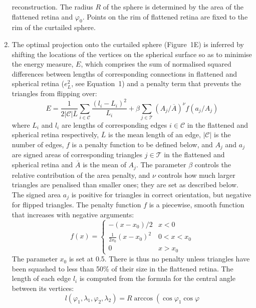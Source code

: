 \documentclass[10pt]{article}
\newcounter{Figure}
\begin{document}
\begin{enumerate}
reconstruction. The radius  $R$ of the sphere is determined by the
area of the flattened retina and  $\varphi _0$. Points on the rim of
flattened retina are fixed to the rim of the curtailed sphere. 
\item The optimal projection onto the curtailed sphere (Figure~1E) is
inferred by shifting the locations of the vertices on the spherical
surface so as to minimise the energy measure,  $E$, which comprises
the sum of normalised squared differences between lengths of
corresponding connections in flattened and spherical retina ($e_L^2$, see Equation~1) and a penalty term that prevents the
triangles from flipping over:
\begin{equation}
E=\frac 1{2|\mathcal{C}|\overline L}\underset{i\in\mathcal{C}}{\sum
}\frac{\left(l_i-L_i\right)^2}{L_i}+\beta \underset{j\in\mathcal{T}}{\sum
}\left(A_j/\overline A\right)^{\nu }f\left(a_j/A_j\right)
\end{equation}
 where  $L_i$ and  $l_i$ are lengths of corresponding edges 
$i\in\mathcal{C}$ in the flattened and spherical retina respectively, 
$\overline L$ is the mean length of an edge,  $|\mathcal{C}|$ is the number of
edges,  $f$ is a penalty function to be defined below, and  $A_j$ and
 $a_j$ are signed areas of corresponding triangles  $j\in\mathcal{T}$ in the
flattened and spherical retina and  $\overline A$ is the mean of 
$A_j$. The parameter  $\beta $ controls the relative contribution of
the area penalty, and  $\nu $ controls how much larger triangles are
penalised than smaller ones; they are set as described below. The
signed area  $a_j$ is positive for triangles in correct orientation,
but negative for flipped triangles. The penalty function  $f$ is a
piecewise, smooth function that increases with negative arguments:
\begin{equation}
f\left(x\right)=\left\{\begin{matrix}-\left(x-x_0\right)/2&x<0\\\frac
1{2x_0}\left(x-x_0\right)^2&0<x<x_0\\0&x>x_0\end{matrix}\right.
\end{equation}
 The parameter  $x_0$ is set at 0.5. There is thus no penalty
unless triangles have been squashed to less than 50\% of their size
in the flattened retina. The length of each edge  $l_i$ is computed
from the formula for the central angle between its vertices:
\begin{equation}
l\left(\varphi _1,\lambda _1,\varphi _2,\lambda
_2\right)=R\arccos \left(\cos \varphi _1\cos \varphi

\end{equation}
\end{enumerate}
\end{document}
